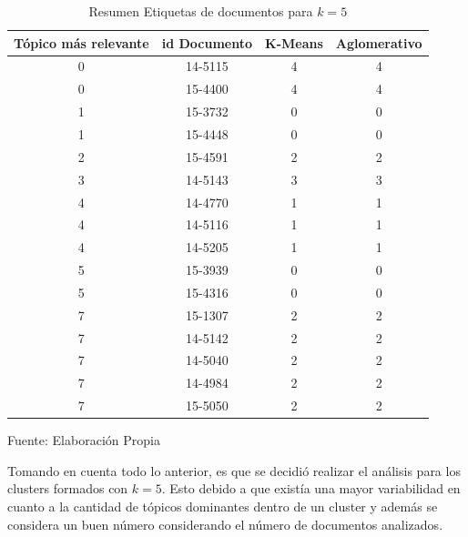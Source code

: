     \begin{table}[H]
    \centering
\begin{tabular}{|c|c|c|c|}
\hline
Tópico más relevante & id Documento & K-Means & Aglomerativo \\ \hline
0                    & 14-5115      & 4       & 4            \\ \hline
0                    & 15-4400      & 4       & 4            \\ \hline
1                    & 15-3732      & 0       & 0            \\ \hline
1                    & 15-4448      & 0       & 0            \\ \hline
2                    & 15-4591      & 2       & 2            \\ \hline
3                    & 14-5143      & 3       & 3            \\ \hline
4                    & 14-4770      & 1       & 1            \\ \hline
4                    & 14-5116      & 1       & 1            \\ \hline
4                    & 14-5205      & 1       & 1            \\ \hline
5                    & 15-3939      & 0       & 0            \\ \hline
5                    & 15-4316      & 0       & 0            \\ \hline
7                    & 15-1307      & 2       & 2            \\ \hline
7                    & 14-5142      & 2       & 2            \\ \hline
7                    & 14-5040      & 2       & 2            \\ \hline
7                    & 14-4984      & 2       & 2            \\ \hline
7                    & 15-5050      & 2       & 2            \\ \hline
\end{tabular}
\caption{\label{table:Cluster_Etiquetas_5} Resumen Etiquetas de documentos para $k=5$} Fuente: Elaboración Propia
\end{table}
    Tomando en cuenta todo lo anterior, es que se decidió realizar el análisis para los clusters formados con $k=5$. Esto  debido a que existía una mayor variabilidad en cuanto a la cantidad de tópicos dominantes dentro de un cluster  y además se considera un buen número considerando el número de documentos analizados.
    
